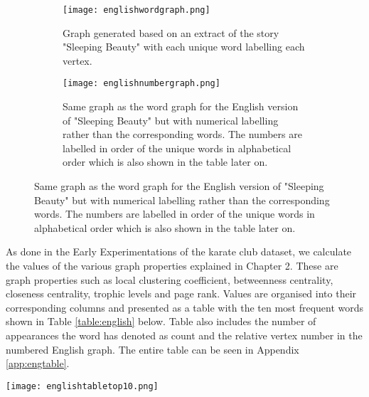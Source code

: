 \begin{figure}[H]
\centering
\begin{subfigure}{.45\textwidth}
	\texttt{[image: englishwordgraph.png]}
	\caption{Graph generated based on an extract of the story "Sleeping Beauty" with each unique word labelling each vertex.}
	\label{fig:engword}
\end{subfigure}
\hfill
\begin{subfigure}{.45\textwidth}
	\texttt{[image: englishnumbergraph.png]}
	\caption{Same graph as the word graph for the English version of "Sleeping Beauty" but with numerical labelling rather than the corresponding words. The numbers are labelled in order of the unique words in alphabetical order which is also shown in the table later on.}
	\label{fig:engnum}
\end{subfigure}
\end{figure}

As done in the Early Experimentations of the karate club dataset, we calculate the values of the various graph properties explained in Chapter 2. These are graph properties such as local clustering coefficient, betweenness centrality, closeness centrality, trophic levels and page rank. Values are organised into their corresponding columns and presented as a table with the ten most frequent words shown in Table \ref{table:english} below. Table also includes the number of appearances the word has denoted as count and the relative vertex number in the numbered English graph. The entire table can be seen in Appendix \ref{app:engtable}.

\begin{table}[H]
	\centering
	\texttt{[image: englishtabletop10.png]}
	\caption{First ten entries of the dataset generated for the english version of "Sleeping Beauty" in a table format. }
	\label{table:english}
\end{table}


